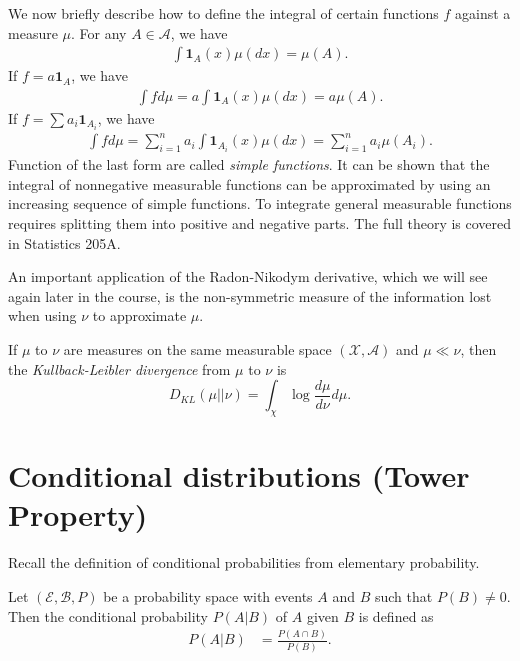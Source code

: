 \documentclass[twoside]{article}
\begin{document}
We now briefly describe how to define the integral of certain functions $f$
against a measure $\mu$.
For any $A \in \mathcal A$, we have
\begin{align*}
   \int \mathbf{1}_A(x) \mu(dx) = \mu(A).
\end{align*}
If $f = a \mathbf{1}_A$, we have
\begin{align*}
   \int f d\mu = a \int \mathbf{1}_A(x) \mu(dx) = a\mu(A).
\end{align*}
If $f = \sum a_i \mathbf{1}_{A_i}$, we have
\begin{align*}
   \int f d\mu =  \sum_{i=1}^n a_i \int \mathbf{1}_{A_i}(x) \mu(dx) = \sum_{i=1}^n a_i \mu(A_i).
\end{align*}
Function of the last form are called \emph{simple functions}.  It can be shown
that the integral of nonnegative measurable functions can be approximated by
using an increasing sequence of simple functions.  To integrate general measurable
functions requires splitting them into positive and negative parts.  The full
theory is covered in Statistics 205A.

An important application of the Radon-Nikodym derivative, which we will see
again later in the course, is the non-symmetric measure of the information
lost when using $\nu$ to approximate $\mu$.

\begin{definition}
  If  $\mu$ to $\nu$ are measures on the same measurable space
  $(\mathcal X, \mathcal A)$ and
  $\mu \ll \nu$, then the \emph{Kullback-Leibler divergence} from
  $\mu$ to $\nu$ is
  \[ D_{KL}(\mu || \nu) = \int_\chi \log \frac{d\mu}{d\nu} d\mu. \]
\end{definition}

\section{Conditional distributions (Tower Property)}

Recall the definition of conditional probabilities from elementary probability.

\begin{definition}
  Let $(\mathcal E, \mathcal B, P)$ be a probability space with events $A$ and $B$
  such that $P(B) \neq 0$.  Then the conditional probability $P(A|B)$ of $A$
  given $B$ is defined as 
  \begin{align*}
    P(A | B) &= \frac{P(A \cap B)}{P(B)}. 
  \end{align*}
\end{definition}
\end{document}
